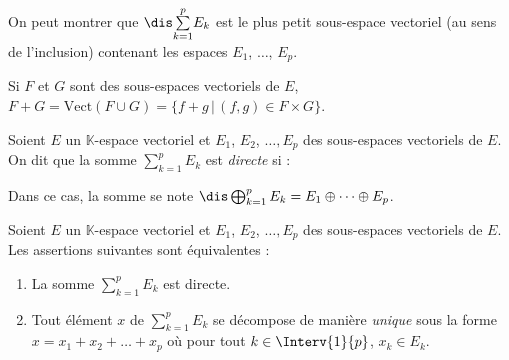 \documentclass[a4paper,10pt]{report}
\newcommand{\Sum}[2]{\ensuremath{\textstyle{\sum\limits_{#1}^{#2}}}}
\begin{document}
\begin{rems} 
\item On peut montrer que $\dis \Sum{k=1}{p} E_k$ est le plus petit sous-espace vectoriel (au sens de l'inclusion) contenant les espaces $E_1$, $\ldots$, $E_p$. 
\item Si $F$ et $G$ sont des sous-espaces vectoriels de $E$, $F+G = \textrm{Vect}(F \cup G) = \lbrace f+g \, \vert \, (f,g) \in F \times G\rbrace$.
\end{rems}

\begin{defin} 
Soient $E$ un $\mathbb{K}$-espace vectoriel et $E_1$, $E_2$, $\ldots, E_p$ des sous-espaces vectoriels de $E$. On dit que la somme $\Sum{k=1}{p} E_k$ est \textit{directe} si :

\vspace{1cm}
%
Dans ce cas, la somme se note $\dis \bigoplus_{k=1}^p E_k = E_1 \oplus \cdots \oplus E_p$.
\end{defin}

\begin{prop}
Soient $E$ un $\mathbb{K}$-espace vectoriel et $E_1$, $E_2$, $\ldots, E_p$ des sous-espaces vectoriels de $E$. Les assertions suivantes sont équivalentes :
\begin{enumerate}
\item La somme $\Sum{k=1}{p} E_k$ est directe.
\item Tout élément $x$ de $\Sum{k=1}{p} E_k$ se décompose de manière \textit{unique} sous la forme $x = x_1 + x_2 + \ldots + x_p$ où pour tout $k \in \Interv{1}{p}$, $x_k \in E_k$.
\end{enumerate}
\end{prop}
\end{document}

